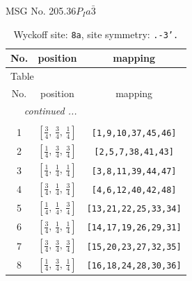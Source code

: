 \documentclass[fleqn,8pt]{jsarticle}
\begin{document}
\setcounter{MaxMatrixCols}{32}

\renewcommand{\tablename}{Table~}
\renewcommand{\figurename}{Figure~}
\begin{center}
\LARGE
MSG No. 205.36\quad$P_{I}a\bar{3}$
\end{center}
\renewcommand{\arraystretch}{1.2}
\begin{longtable}{ccc}
\caption{Wyckoff site: {\tt 8a}, site symmetry: {\tt .-3'.}}
 \\
 \hline \hline
No. & position & mapping \\ \hline \endfirsthead

\multicolumn{2}{l}{\tablename\ \thetable{}} \\
 \hline \hline
No. & position & mapping \\ \hline \endhead

 \hline \hline
\multicolumn{2}{r}{\footnotesize\it continued ...} \\ \endfoot

 \hline \hline
\multicolumn{2}{r}{} \\ \endlastfoot

1 & $\left[ \frac{3}{4},\, \frac{3}{4},\, \frac{1}{4} \right]$ & {\tt [1,9,10,37,45,46]} \\ \hline
2 & $\left[ \frac{1}{4},\, \frac{3}{4},\, \frac{3}{4} \right]$ & {\tt [2,5,7,38,41,43]} \\ \hline
3 & $\left[ \frac{1}{4},\, \frac{1}{4},\, \frac{1}{4} \right]$ & {\tt [3,8,11,39,44,47]} \\ \hline
4 & $\left[ \frac{3}{4},\, \frac{1}{4},\, \frac{3}{4} \right]$ & {\tt [4,6,12,40,42,48]} \\ \hline
5 & $\left[ \frac{1}{4},\, \frac{1}{4},\, \frac{3}{4} \right]$ & {\tt [13,21,22,25,33,34]} \\ \hline
6 & $\left[ \frac{3}{4},\, \frac{1}{4},\, \frac{1}{4} \right]$ & {\tt [14,17,19,26,29,31]} \\ \hline
7 & $\left[ \frac{3}{4},\, \frac{3}{4},\, \frac{3}{4} \right]$ & {\tt [15,20,23,27,32,35]} \\ \hline
8 & $\left[ \frac{1}{4},\, \frac{3}{4},\, \frac{1}{4} \right]$ & {\tt [16,18,24,28,30,36]} \\
\end{longtable}
\renewcommand{\arraystretch}{1.2}
\end{document}
